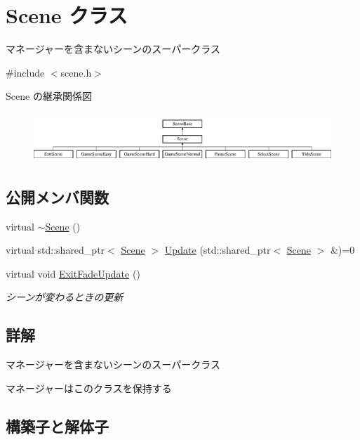 \hypertarget{class_scene}{}\section{Scene クラス}
\label{class_scene}


マネージャーを含まないシーンのスーパークラス  




{\ttfamily \#include $<$scene.\+h$>$}

Scene の継承関係図\begin{figure}[H]
\begin{center}
\leavevmode
\includegraphics[height=1.875000cm]{class_scene}
\end{center}
\end{figure}
\subsection*{公開メンバ関数}
\begin{DoxyCompactItemize}
\item 
virtual \mbox{\hyperlink{class_scene_aa0a5be58e2ee2d1fdafc5fb46b5e661e}{$\sim$\+Scene}} ()
\item 
virtual std\+::shared\+\_\+ptr$<$ \mbox{\hyperlink{class_scene}{Scene}} $>$ \mbox{\hyperlink{class_scene_ab71ee5f19764b90c87b4574aa1cb1d25}{Update}} (std\+::shared\+\_\+ptr$<$ \mbox{\hyperlink{class_scene}{Scene}} $>$ \&)=0
\item 
virtual void \mbox{\hyperlink{class_scene_ad19a449c6ed452823dae14183689570c}{Exit\+Fade\+Update}} ()
\begin{DoxyCompactList}\small\item\em シーンが変わるときの更新 \end{DoxyCompactList}\end{DoxyCompactItemize}


\subsection{詳解}
マネージャーを含まないシーンのスーパークラス 

マネージャーはこのクラスを保持する 

\subsection{構築子と解体子}
\mbox{\label{class_scene_aa0a5be58e2ee2d1fdafc5fb46b5e661e}} 
